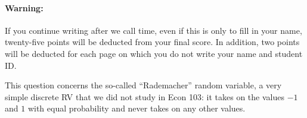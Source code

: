 \documentclass[addpoints,12pt]{exam}
\begin{document}
\paragraph{Warning:} If you continue writing after we call time, even if this is only to fill in your name, twenty-five points will be deducted from your final score. In addition, two points will be deducted for each page on which you do not write your name and student ID. 

\newpage
\begin{questions}

\question This question concerns the so-called ``Rademacher'' random variable, a very simple discrete RV that we did not study in Econ 103: it takes on the values $-1$ and $1$ with equal probability and never takes on any other values. 
\end{questions}
\end{document}
